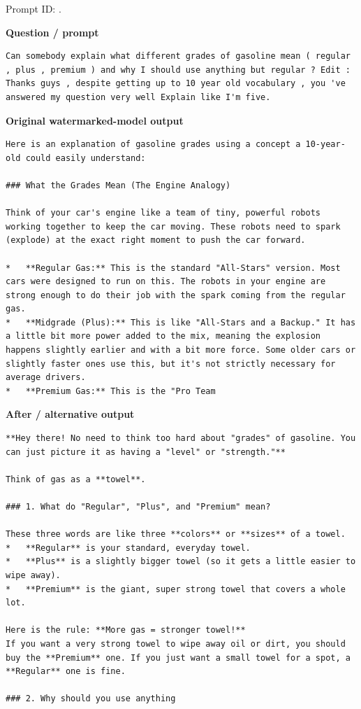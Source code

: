 Prompt ID:
\texttt{}.

\textbf{Question / prompt}

\begin{Verbatim}
Can somebody explain what different grades of gasoline mean ( regular , plus , premium ) and why I should use anything but regular ? Edit : Thanks guys , despite getting up to 10 year old vocabulary , you 've answered my question very well Explain like I'm five.
\end{Verbatim}

\textbf{Original watermarked-model output}

\begin{Verbatim}
Here is an explanation of gasoline grades using a concept a 10-year-old could easily understand:

### What the Grades Mean (The Engine Analogy)

Think of your car's engine like a team of tiny, powerful robots working together to keep the car moving. These robots need to spark (explode) at the exact right moment to push the car forward.

*   **Regular Gas:** This is the standard "All-Stars" version. Most cars were designed to run on this. The robots in your engine are strong enough to do their job with the spark coming from the regular gas.
*   **Midgrade (Plus):** This is like "All-Stars and a Backup." It has a little bit more power added to the mix, meaning the explosion happens slightly earlier and with a bit more force. Some older cars or slightly faster ones use this, but it's not strictly necessary for average drivers.
*   **Premium Gas:** This is the "Pro Team
\end{Verbatim}

\textbf{After / alternative output}

\begin{Verbatim}
**Hey there! No need to think too hard about "grades" of gasoline. You can just picture it as having a "level" or "strength."**

Think of gas as a **towel**.

### 1. What do "Regular", "Plus", and "Premium" mean?

These three words are like three **colors** or **sizes** of a towel.
*   **Regular** is your standard, everyday towel.
*   **Plus** is a slightly bigger towel (so it gets a little easier to wipe away).
*   **Premium** is the giant, super strong towel that covers a whole lot.

Here is the rule: **More gas = stronger towel!**
If you want a very strong towel to wipe away oil or dirt, you should buy the **Premium** one. If you just want a small towel for a spot, a **Regular** one is fine.

### 2. Why should you use anything
\end{Verbatim}

